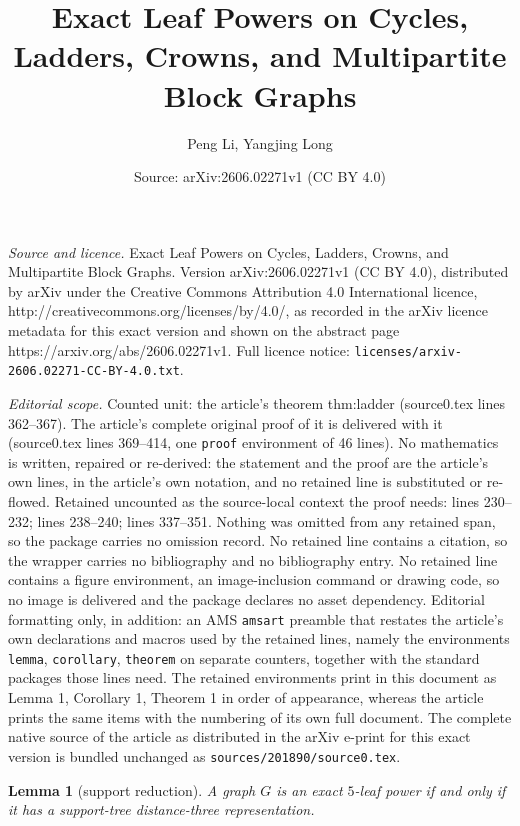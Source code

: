\documentclass[10pt,a4paper]{amsart}
\title{Exact Leaf Powers on Cycles, Ladders, Crowns, and Multipartite Block Graphs}
\author{Peng Li, Yangjing Long}
\date{Source: arXiv:2606.02271v1 (CC BY 4.0)}
\newtheorem{lemma}{Lemma}
\begin{document}
\maketitle

\noindent\emph{Source and licence.} Exact Leaf Powers on Cycles, Ladders, Crowns, and Multipartite Block Graphs. Version arXiv:2606.02271v1 (CC BY 4.0), distributed by arXiv under the Creative Commons Attribution 4.0 International licence, http://creativecommons.org/licenses/by/4.0/, as recorded in the arXiv licence metadata for this exact version and shown on the abstract page https://arxiv.org/abs/2606.02271v1. Full licence notice: \texttt{licenses/arxiv-2606.02271-CC-BY-4.0.txt}.\par\smallskip

\noindent\textit{Editorial scope.} Counted unit: the article's theorem thm:ladder (source0.tex lines 362--367). The article's complete original proof of it is delivered with it (source0.tex lines 369--414, one \texttt{proof} environment of 46 lines). No mathematics is written, repaired or re-derived: the statement and the proof are the article's own lines, in the article's own notation, and no retained line is substituted or re-flowed.  Retained uncounted as the source-local context the proof needs: lines 230--232; lines 238--240; lines 337--351.  Nothing was omitted from any retained span, so the package carries no omission record.  No retained line contains a citation, so the wrapper carries no bibliography and no bibliography entry.  No retained line contains a figure environment, an image-inclusion command or drawing code, so no image is delivered and the package declares no asset dependency.  Editorial formatting only, in addition: an AMS \texttt{amsart} preamble that restates the article's own declarations and macros used by the retained lines, namely the environments \texttt{lemma}, \texttt{corollary}, \texttt{theorem} on separate counters, together with the standard packages those lines need.  The retained environments print in this document as Lemma 1, Corollary 1, Theorem 1 in order of appearance, whereas the article prints the same items with the numbering of its own full document.  The complete native source of the article as distributed in the arXiv e-print for this exact version is bundled unchanged as \texttt{sources/201890/source0.tex}.
\begin{lemma}[support reduction]\label{lem:support-reduction}
A graph $G$ is an exact $5$-leaf power if and only if it has a support-tree distance-three representation.
\end{lemma}
\end{document}
